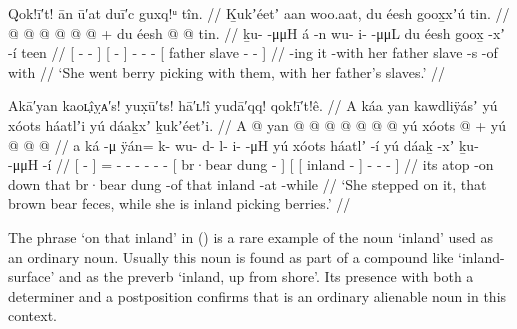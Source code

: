 \ex\label{ex:89-3-berry-picking-with-dads-slaves}%
%
\begingl
	\glpreamble	Qok!ī′t! ān ū′at duī′c guxq!ᵘ tîn. //
	\glpreamble	Ḵukʼéetʼ aan woo.aat, du éesh goox̱xʼú tin. //
	\gla	{}  @ {} @ {} {} {}
		{}  @ {} {}
		 @ {} @ {} @ {} +
		{} du éesh  @ {} @ {} tin. {} //
	\glb	{} ḵu-  -μμH {} {}
		{} á -n {}
		wu- i-  -μμL
		{} du éesh goox̱ -xʼ -í teen {} //
	\glc	{}[ -  - \· {}]
		{}[  - {}]
		- -  -
		{}[  father slave - -  {}] //
	\gld	{}  {} {} -ing {}
		{} it -with {}
		 {} {} {}
		{} her father slave -s -of with {} //
	\glft	‘She went berry picking with them, with her father’s slaves.’
		//
\endgl
\xe

\ex\label{ex:89-4-step-dung-picking-berries}%
%
\begingl
	\glpreamble	Akā′yan kaoʟ̣îỵᴀ′s! yux̣ū′ts! hā′ʟ!î yudā′qq! qok!ī′t!ê. //
	\glpreamble	A káa yan kawdliÿásʼ yú xóots háatlʼi yú dáaḵxʼ ḵukʼéetʼi. //
	\gla	{} A  @ {} {}
		yan @  @ {} @ {} @ {} @ {} @ {} @ {}
		{} yú xóots  @ {} {} +
		{} {} yú  @ {} {}
			 @ {} @ {} {} {} //
	\glb	{} a ká -μ {}
		ÿán= k- wu- d- l- i-  -μH
		{} yú xóots háatlʼ -í {}
		{} {} yú dáaḵ -xʼ {} 
			ḵu-  -μμH -í {} //
	\glc	{}[   - {}]
		= - - - - -  -
		{}[  br·bear dung - {}]
		{}[ {}[  inland - {}]
			-  - - {}] //
	\gld	{} its atop -on {}
		down  {} {} {} {} {} {}
		{} that br·bear dung -of {}
		{} {} that inland -at {}
			 {} {} -while {} //
	\glft	‘She stepped on it, that brown bear feces, while she is inland picking berries.’
		//
\endgl
\xe

The phrase  ‘on that inland’ in (\lastx) is a rare example of the noun  ‘inland’ used as an ordinary noun.
Usually this noun is found as part of a compound like  ‘inland-surface’ and as the preverb  ‘inland, up from shore’.
Its presence with both a determiner  and a postposition  confirms that  is an ordinary alienable noun in this context.

